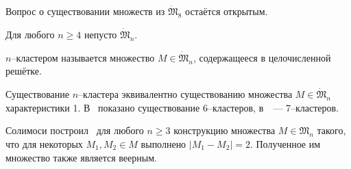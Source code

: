 Вопрос о существовании множеств из $\dot{\mathfrak{M}}_8$
остаётся открытым.

\begin{hypothesis}
	\label{hypot:general_position_nonempty}
	Для любого $n\geq 4$ непусто $\dot{\mathfrak{M}}_n$.
\end{hypothesis}


\begin{definition}
	\cite{noll1989nclusters,kurz2013constructing}
	$n$--кластером называется множество $M\in\dot{\mathfrak{M}}_n$,
	содержащееся в целочисленной решётке.
\end{definition}
Существование $n$--кластера эквивалентно существованию множества $M\in\dot{\mathfrak{M}}_n$
характеристики 1.
В~\cite{noll1989nclusters} показано существование 6--кластеров,
в~\cite{kurz2013constructing}~--- 7--кластеров.


Солимоси построил~\cite{solymosi2003note} для любого $n\geq 3$ конструкцию множества $M\in\mathfrak{M}_n$
такого, что для некоторых $M_1, M_2 \in M$ выполнено $|M_1 - M_2| = 2$.
Полученное им множество также является веерным.

